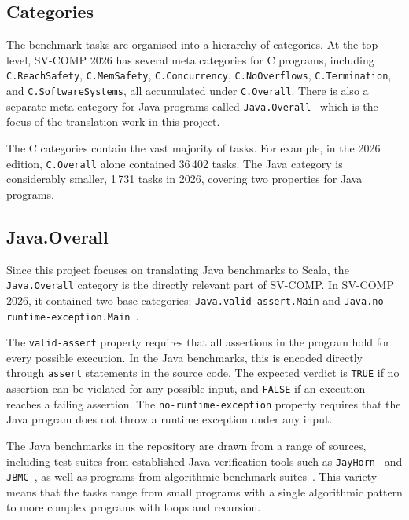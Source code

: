 \documentclass[11pt,titlepage,openright]{book}
\begin{document}
\subsection{Categories}
\label{sec:svcomp-categories}
 
The benchmark tasks are organised into a hierarchy of categories.
At the top level, SV-COMP 2026 has several meta categories for C
programs, including \texttt{C.ReachSafety}, \texttt{C.MemSafety},
\texttt{C.Concurrency}, \texttt{C.NoOverflows}, \texttt{C.Termination},
and \texttt{C.SoftwareSystems}, all accumulated under \texttt{C.Overall}.
There is also a separate meta category for Java programs called
\texttt{Java.Overall}~\cite{SV-COMP2026} which is the focus of the
translation work in this project.
 
The C categories contain the vast majority of tasks. For example, in
the 2026 edition, \texttt{C.Overall} alone contained 36\,402 tasks.
The Java category is considerably smaller, 1\,731 tasks in 2026,
covering two properties for Java programs.

\subsection{Java.Overall}
\label{sec:svcomp-java}

Since this project focuses on translating Java benchmarks to Scala, the
\texttt{Java.Overall} category is the directly relevant part of SV-COMP.
In SV-COMP 2026, it contained two base categories:
\texttt{Java.valid-assert.Main} and \texttt{Java.no-runtime-exception.Main}~\cite{SV-COMP2026}.
 
The \texttt{valid-assert} property requires that all assertions in
the program hold for every possible execution.
In the Java benchmarks, this is encoded directly through
\texttt{assert} statements in the source code. The expected verdict is
\texttt{TRUE} if no assertion can be violated for any possible input, and
\texttt{FALSE} if an execution reaches a failing assertion.
The \texttt{no-runtime-exception} property requires that the Java
program does not throw a runtime exception under any input.
 
The Java benchmarks in the repository are drawn from a range of sources,
including test suites from established Java verification tools such as
\texttt{JayHorn}~\cite{JayHorn} and \texttt{JBMC}~\cite{JBMC}, as well as
programs from algorithmic benchmark suites~\cite{SV-COMP2026}.
This variety means that the tasks range from small programs with a
single algorithmic pattern to more complex programs with 
loops and recursion.
 
\end{document}

